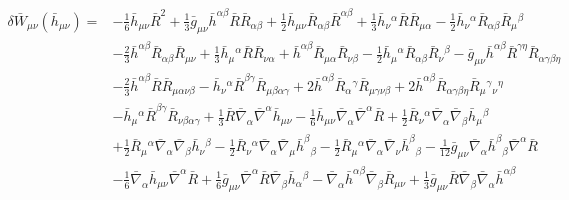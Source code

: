 \documentclass[10pt,letterpaper]{article}
\begin{document}
\begin{align}
\delta \bar W_{\mu\nu}( \bar h_{\mu\nu})={}&- \tfrac{1}{6} \bar h_{\mu \nu} \bar R^2
 + \tfrac{1}{3} \bar g_{\mu \nu} \bar h^{\alpha \beta} \bar R \bar R_{\alpha \beta}
 + \tfrac{1}{2} \bar h_{\mu \nu} \bar R_{\alpha \beta} \bar R^{\alpha \beta}
 + \tfrac{1}{3} \bar h_{\nu}{}^{\alpha} \bar R \bar R_{\mu \alpha}
 -  \tfrac{1}{2} \bar h_{\nu}{}^{\alpha} \bar R_{\alpha \beta} \bar R_{\mu}{}^{\beta}\nonumber\\
& -  \tfrac{2}{3} \bar h^{\alpha \beta} \bar R_{\alpha \beta} \bar R_{\mu \nu}
 + \tfrac{1}{3} \bar h_{\mu}{}^{\alpha} \bar R \bar R_{\nu \alpha}
 + \bar h^{\alpha \beta} \bar R_{\mu \alpha} \bar R_{\nu \beta}
 -  \tfrac{1}{2} \bar h_{\mu}{}^{\alpha} \bar R_{\alpha \beta} \bar R_{\nu}{}^{\beta}
 -  \bar g_{\mu \nu} \bar h^{\alpha \beta} \bar R^{\gamma \eta} \bar R_{\alpha \gamma \beta \eta}\nonumber\\
& -  \tfrac{2}{3} \bar h^{\alpha \beta} \bar R \bar R_{\mu \alpha \nu \beta}
 -  \bar h_{\nu}{}^{\alpha} \bar R^{\beta \gamma} \bar R_{\mu \beta \alpha \gamma}
 + 2 \bar h^{\alpha \beta} \bar R_{\alpha}{}^{\gamma} \bar R_{\mu \gamma \nu \beta}
 + 2 \bar h^{\alpha \beta} \bar R_{\alpha \gamma \beta \eta} \bar R_{\mu}{}^{\gamma}{}_{\nu}{}^{\eta}\nonumber\\
& -  \bar h_{\mu}{}^{\alpha} \bar R^{\beta \gamma} \bar R_{\nu \beta \alpha \gamma}
 + \tfrac{1}{3} \bar R \bar\nabla_{\alpha}\bar\nabla^{\alpha}\bar h_{\mu \nu}
 -  \tfrac{1}{6} \bar h_{\mu \nu} \bar\nabla_{\alpha}\bar\nabla^{\alpha}\bar R
 + \tfrac{1}{2} \bar R_{\nu}{}^{\alpha} \bar\nabla_{\alpha}\bar\nabla_{\beta}\bar h_{\mu}{}^{\beta}\nonumber\\
& + \tfrac{1}{2} \bar R_{\mu}{}^{\alpha} \bar\nabla_{\alpha}\bar\nabla_{\beta}\bar h_{\nu}{}^{\beta}
 -  \tfrac{1}{2} \bar R_{\nu}{}^{\alpha} \bar\nabla_{\alpha}\bar\nabla_{\mu}\bar h^{\beta}{}_{\beta}
 -  \tfrac{1}{2} \bar R_{\mu}{}^{\alpha} \bar\nabla_{\alpha}\bar\nabla_{\nu}\bar h^{\beta}{}_{\beta}
 -  \tfrac{1}{12} \bar g_{\mu \nu} \bar\nabla_{\alpha}\bar h^{\beta}{}_{\beta} \bar\nabla^{\alpha}\bar R\nonumber\\
& -  \tfrac{1}{6} \bar\nabla_{\alpha}\bar h_{\mu \nu} \bar\nabla^{\alpha}\bar R
 + \tfrac{1}{6} \bar g_{\mu \nu} \bar\nabla^{\alpha}\bar R \bar\nabla_{\beta}\bar h_{\alpha}{}^{\beta}
 -  \bar\nabla_{\alpha}\bar h^{\alpha \beta} \bar\nabla_{\beta}\bar R_{\mu \nu}
 + \tfrac{1}{3} \bar g_{\mu \nu} \bar R \bar\nabla_{\beta}\bar\nabla_{\alpha}\bar h^{\alpha \beta}\nonumber\\

\end{align}
\end{document}
